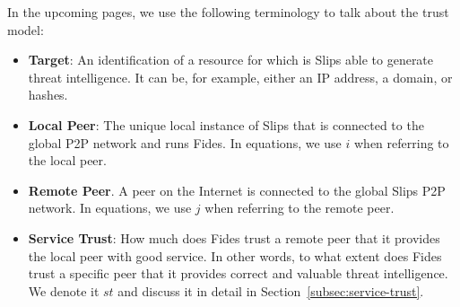 \vspace{1cm}

\noindent
In the upcoming pages, we use the following terminology to talk about the trust model:

\begin{itemize}

\item \textbf{Target}: An identification of a resource for which is Slips able to generate threat intelligence. It can be, for example, either an IP address, a domain, or hashes.

\item \textbf{Local Peer}: The unique local instance of Slips that is connected to the global P2P network and runs Fides. In equations, we use $i$ when referring to the local peer.

\item \textbf{Remote Peer}. A peer on the Internet is connected to the global Slips P2P network. In equations, we use $j$ when referring to the remote peer.

\item \textbf{Service Trust}: How much does Fides trust a remote peer that it provides the local peer with good service. In other words, to what extent does Fides trust a specific peer that it provides correct and valuable threat intelligence. We denote it $st$ and discuss it in detail in Section~\ref{subsec:service-trust}.

\end{itemize}











